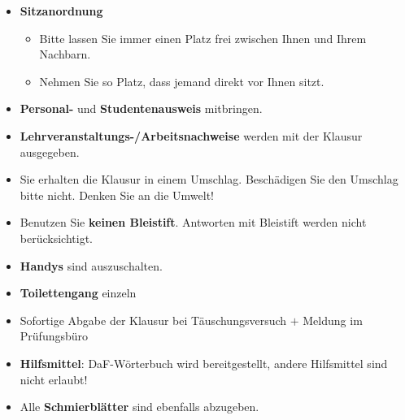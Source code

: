 \begin{frame}

\begin{itemize}

	\item \textbf{Sitzanordnung}
	\begin{itemize}
		\item Bitte lassen Sie immer einen Platz frei zwischen Ihnen und Ihrem Nachbarn.
		\item Nehmen Sie so Platz, dass jemand direkt vor Ihnen sitzt.
	\end{itemize}

	\item \textbf{Personal-} und \textbf{Studentenausweis} mitbringen.

	\item \textbf{Lehrveranstaltungs-/Arbeitsnachweise} werden mit der Klausur ausgegeben.

	 	
	
	
%
%
%
%
	\item Sie erhalten die Klausur in einem Umschlag. Beschädigen Sie den Umschlag bitte nicht. Denken Sie an die Umwelt!

	\item Benutzen Sie \textbf{keinen Bleistift}. Antworten mit Bleistift werden nicht berücksichtigt.
	
	\item \textbf{Handys} sind auszuschalten. 

	\item \textbf{Toilettengang} einzeln

	\item Sofortige Abgabe der Klausur bei Täuschungsversuch $+$ Meldung im Prüfungsbüro

	\item \textbf{Hilfsmittel}: DaF-Wörterbuch wird bereitgestellt, andere Hilfsmittel sind nicht erlaubt!

	\item Alle \textbf{Schmierblätter} sind ebenfalls abzugeben.
	
\end{itemize}

\end{frame}


